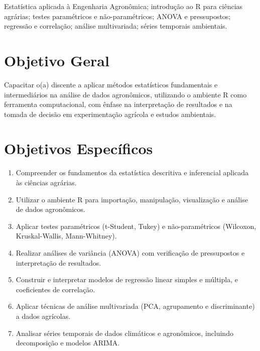 \documentclass[11pt,a4paper]{article}
\begin{document}
\vspace{0.3cm}



\begin{tcolorbox}[ementabox]
Estatística aplicada à Engenharia Agronômica; introdução ao R para ciências agrárias; testes paramétricos e não-paramétricos; ANOVA e pressupostos; regressão e correlação; análise multivariada; séries temporais ambientais.
\end{tcolorbox}


\section*{Objetivo Geral}

Capacitar o(a) discente a aplicar métodos estatísticos fundamentais e intermediários na análise de dados agronômicos, utilizando o ambiente R como ferramenta computacional, com ênfase na interpretação de resultados e na tomada de decisão em experimentação agrícola e estudos ambientais.

\section*{Objetivos Específicos}

\begin{enumerate}

\item Compreender os fundamentos da estatística descritiva e inferencial aplicada às ciências agrárias.

\item Utilizar o ambiente R para importação, manipulação, visualização e análise de dados agronômicos.

\item Aplicar testes paramétricos (t-Student, Tukey) e não-paramétricos (Wilcoxon, Kruskal-Wallis, Mann-Whitney).

\item Realizar análises de variância (ANOVA) com verificação de pressupostos e interpretação de resultados.

\item Construir e interpretar modelos de regressão linear simples e múltipla, e coeficientes de correlação.

\item Aplicar técnicas de análise multivariada (PCA, agrupamento e discriminante) a dados agrícolas.

\item Analisar séries temporais de dados climáticos e agronômicos, incluindo decomposição e modelos ARIMA.

\end{enumerate}
\end{document}
